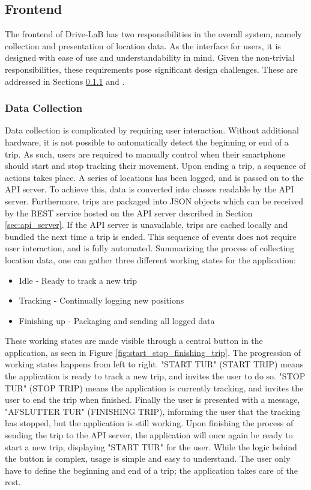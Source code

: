 \subsection{Frontend}\label{subsec:frontend_design}
The frontend of Drive-LaB has two responsibilities in the overall system, namely collection and presentation of location data. As the interface for users, it is designed with ease of use and understandability in mind. Given the non-trivial responsibilities, these requirements pose significant design challenges. These are addressed in Sections \ref{subsubsec:design_datacollection} and \label{subsubsec:design_datapresentation}.

\subsubsection{Data Collection}\label{subsubsec:design_datacollection}
Data collection is complicated by requiring user interaction. Without additional hardware, it is not possible to automatically detect the beginning or end of a trip. As such, users are required to manually control when their smartphone should start and stop tracking their movement.
Upon ending a trip, a sequence of actions takes place. A series of locations has been logged, and is passed on to the API server. To achieve this, data is converted into classes readable by the API server. Furthermore, trips are packaged into JSON objects which can be received by the REST service hosted on the API server described in Section \ref{sec:api_server}. If the API server is unavailable, trips are cached locally and bundled the next time a trip is ended. This sequence of events does not require user interaction, and is fully automated. Summarizing the process of collecting location data, one can gather three different working states for the application:

\begin{itemize}
\item Idle - Ready to track a new trip
\item Tracking - Continually logging new positions
\item Finishing up - Packaging and sending all logged data
\end{itemize}

These working states are made visible through a central button in the application, as seen in Figure \ref{fig:start_stop_finishing_trip}. The progression of working states happens from left to right. "START TUR" (START TRIP) means the application is ready to track a new trip, and invites the user to do so. "STOP TUR" (STOP TRIP) means the application is currently tracking, and invites the user to end the trip when finished. Finally the user is presented with a message, "AFSLUTTER TUR" (FINISHING TRIP), informing the user that the tracking has stopped, but the application is still working. Upon finishing the process of sending the trip to the API server, the application will once again be ready to start a new trip, displaying "START TUR" for the user.
While the logic behind the button is complex, usage is simple and easy to understand. The user only have to define the beginning and end of a trip; the application takes care of the rest.

